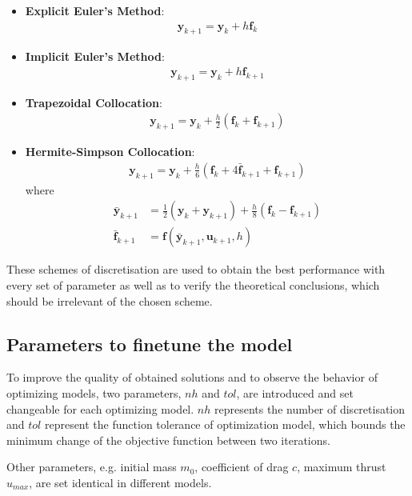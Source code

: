 \documentclass{article}
\begin{document}
\begin{itemize}
    \item \textbf{Explicit Euler's Method}: 
\begin{align*}
    \textbf{y}_{k+1} = \textbf{y}_k + h \textbf{f}_k
\end{align*}
    \item \textbf{Implicit Euler's Method}:
\begin{align*}
    \textbf{y}_{k+1} = \textbf{y}_k + h \textbf{f}_{k+1}
\end{align*}
    \item \textbf{Trapezoidal Collocation}: 
\begin{align*}
    \textbf{y}_{k+1} = \textbf{y}_k + \frac{h}{2} (\textbf{f}_k+\textbf{f}_{k+1})
\end{align*}
    \item \textbf{Hermite-Simpson Collocation}: 
\begin{align*}
    \textbf{y}_{k+1} = \textbf{y}_k + \frac{h}{6} (\textbf{f}_k+4\bar{\textbf{f}}_{k+1}+\textbf{f}_{k+1})
\end{align*}
where 
\begin{align*}
    \bar{\textbf{y}}_{k+1} &= \frac{1}{2}(\textbf{y}_k+\textbf{y}_{k+1}) + \frac{h}{8}(\textbf{f}_k -\textbf{f}_{k+1} ) \\
    \bar{\textbf{f}}_{k+1} &= \textbf{f}(\bar{\textbf{y}}_{k+1},\textbf{u}_{k+1},h)
\end{align*}
\end{itemize}

These schemes of discretisation are used to obtain the best performance with every set of parameter as well as to verify the theoretical conclusions, which should be irrelevant of the chosen scheme. 

\subsection{Parameters to finetune the model}
To improve the quality of obtained solutions and to observe the behavior of optimizing models, two parameters, $nh$ and $tol$, are introduced and set changeable for each optimizing model. $nh$ represents the number of discretisation and $tol$ represent the function tolerance of optimization model, which bounds the minimum change of the objective function between two iterations. 

Other parameters, e.g. initial mass $m_0$, coefficient of drag $c$, maximum thrust $u_{max}$, are set identical in different models.
\end{document}
